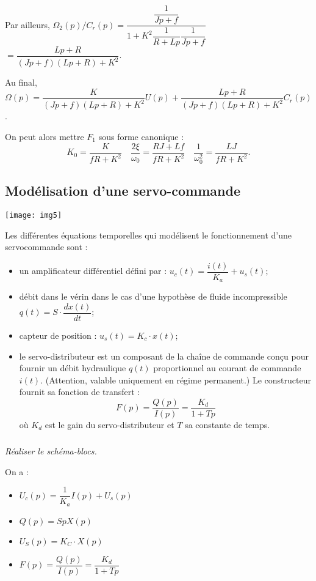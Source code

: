 \begin{multicols}{2}
\begin{corrige}
Par ailleurs, $\Omega_2(p)/C_r(p)=\dfrac{\dfrac{1}{Jp+f}}{1+K^2\dfrac{1}{R+Lp}\dfrac{1}{Jp+f}}$
$=\dfrac{Lp+R}{\left(Jp+f\right)\left(Lp+R\right)+K^2}$.


Au final, $\Omega(p)=\dfrac{K}{\left(Jp+f\right)\left(Lp+R\right)+K^2} U(p) + \dfrac{Lp+R}{\left(Jp+f\right)\left(Lp+R\right)+K^2} C_r(p)$. 

On peut alors mettre $F_1$ sous forme canonique : 
$$
K_0 =\dfrac{K}{fR+K^2}
\quad 
\dfrac{2\xi}{\omega_0} = \dfrac{RJ+Lf}{fR+K^2}
\quad
\dfrac{1}{\omega_0^2} =  \dfrac{LJ}{fR+K^2}.
$$
\end{corrige}
\else
\fi


\subsection*{Modélisation d'une servo-commande}

\setcounter{exo}{0}

\ifprof
\else

\begin{center}
\texttt{[image: img5]}
\end{center}

Les différentes équations temporelles qui modélisent le fonctionnement d'une servocommande sont :
\begin{itemize}
\item un amplificateur différentiel défini par : $u_c(t)=\dfrac{i(t)}{K_a}+u_s(t)$;
\item débit dans le vérin dans le cas d'une hypothèse de fluide incompressible $q(t)=S\cdot\dfrac{dx(t)}{dt}$;
\item capteur de position : $u_s(t)=K_c\cdot x(t)$;
\item le servo-distributeur est un composant de la chaîne de commande conçu pour fournir un débit hydraulique $q(t)$ proportionnel au courant de commande $i(t)$. (Attention, valable uniquement en régime permanent.) Le constructeur fournit sa fonction de transfert :
$$
F(p)=\dfrac{Q(p)}{I(p)}=\dfrac{K_d}{1+Tp}
$$
où $K_d$ est le gain du servo-distributeur et $T$ sa constante de temps.
\end{itemize}
\fi

\subparagraph{}
\textit{Réaliser le schéma-blocs.}
\ifprof
\begin{corrige}
On a :
\begin{itemize}
\item $U_c(p)=\dfrac{1}{K_a}I(p)+U_s(p)$
\item $Q(p)=SpX(p)$
\item $U_S(p)=K_C\cdot X(p)$
\item $F(p)=\dfrac{Q(p)}{I(p)}=\dfrac{K_d}{1+Tp}$
\end{itemize}



\end{corrige}
\end{multicols}

